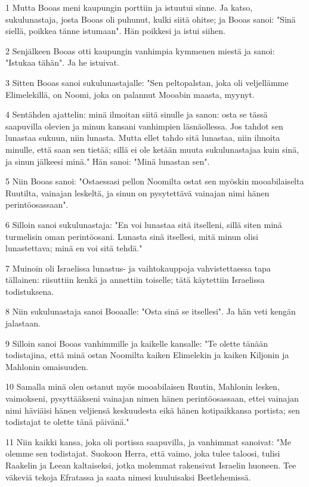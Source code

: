 \par 1 Mutta Booas meni kaupungin porttiin ja istuutui sinne. Ja katso, sukulunastaja, josta Booas oli puhunut, kulki siitä ohitse; ja Booas sanoi: "Sinä siellä, poikkea tänne istumaan". Hän poikkesi ja istui siihen.
\par 2 Senjälkeen Booas otti kaupungin vanhimpia kymmenen miestä ja sanoi: "Istukaa tähän". Ja he istuivat.
\par 3 Sitten Booas sanoi sukulunastajalle: "Sen peltopalstan, joka oli veljellämme Elimelekillä, on Noomi, joka on palannut Mooabin maasta, myynyt.
\par 4 Sentähden ajattelin: minä ilmoitan siitä sinulle ja sanon: osta se tässä saapuvilla olevien ja minun kansani vanhimpien läsnäollessa. Jos tahdot sen lunastaa sukuun, niin lunasta. Mutta ellet tahdo sitä lunastaa, niin ilmoita minulle, että saan sen tietää; sillä ei ole ketään muuta sukulunastajaa kuin sinä, ja sinun jälkeesi minä." Hän sanoi: "Minä lunastan sen".
\par 5 Niin Booas sanoi: "Ostaessasi pellon Noomilta ostat sen myöskin mooabilaiselta Ruutilta, vainajan leskeltä, ja sinun on pysytettävä vainajan nimi hänen perintöosassaan".
\par 6 Silloin sanoi sukulunastaja: "En voi lunastaa sitä itselleni, sillä siten minä turmelisin oman perintöosani. Lunasta sinä itsellesi, mitä minun olisi lunastettava; minä en voi sitä tehdä."
\par 7 Muinoin oli Israelissa lunastus- ja vaihtokauppoja vahvistettaessa tapa tällainen: riisuttiin kenkä ja annettiin toiselle; tätä käytettiin Israelissa todistuksena.
\par 8 Niin sukulunastaja sanoi Booaalle: "Osta sinä se itsellesi". Ja hän veti kengän jalastaan.
\par 9 Silloin sanoi Booas vanhimmille ja kaikelle kansalle: "Te olette tänään todistajina, että minä ostan Noomilta kaiken Elimelekin ja kaiken Kiljonin ja Mahlonin omaisuuden.
\par 10 Samalla minä olen ostanut myös mooabilaisen Ruutin, Mahlonin lesken, vaimokseni, pysyttääkseni vainajan nimen hänen perintöosassaan, ettei vainajan nimi häviäisi hänen veljiensä keskuudesta eikä hänen kotipaikkansa portista; sen todistajat te olette tänä päivänä."
\par 11 Niin kaikki kansa, joka oli portissa saapuvilla, ja vanhimmat sanoivat: "Me olemme sen todistajat. Suokoon Herra, että vaimo, joka tulee taloosi, tulisi Raakelin ja Leean kaltaiseksi, jotka molemmat rakensivat Israelin huoneen. Tee väkeviä tekoja Efratassa ja saata nimesi kuuluisaksi Beetlehemissä.
